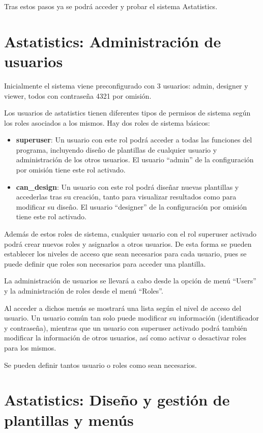 \documentclass[spanish,12pt]{book}
\begin{document}
Tras estos pasos ya se podrá acceder y probar el sistema Astatistics.

\chapter{Astatistics: Administración de usuarios}
Inicialmente el sistema viene preconfigurado con 3 usuarios: admin, designer y viewer, todos con contraseña 4321 por omisión.

Los usuarios de astatistics tienen diferentes tipos de permisos de sistema según los roles asociados a los mismos. Hay dos roles de sistema básicos:

\begin{itemize}
\item {\bf superuser}: Un usuario con este rol podrá acceder a todas las funciones del programa, incluyendo diseño de plantillas de cualquier usuario y administración de los otros usuarios. El usuario ``admin'' de la configuración por omisión tiene este rol activado.
\item {\bf can\_design}: Un usuario con este rol podrá diseñar nuevas plantillas y accederlas tras su creación, tanto para visualizar resultados como para modificar su diseño. El usuario ``designer'' de la configuración por omisión tiene este rol activado.
\end{itemize}

Además de estos roles de sistema, cualquier usuario con el rol superuser activado podrá crear nuevos roles y asignarlos a otros usuarios. De esta forma se pueden establecer los niveles de acceso que sean necesarios para cada usuario, pues se puede definir que roles son necesarios para acceder una plantilla.

La administración de usuarios se llevará a cabo desde la opción de menú ``Users'' y la administración de roles desde el menú ``Roles''.

Al acceder a dichos menús se mostrará una lista según el nivel de acceso del usuario. Un usuario común tan solo puede modificar su información (identificador y contraseña), mientras que un usuario con superuser activado podrá también modificar la información de otros usuarios, así como activar o desactivar roles para los mismos.

Se pueden definir tantos usuario o roles como sean necesarios.

\chapter{Astatistics: Diseño y gestión de plantillas y menús}
\end{document}
